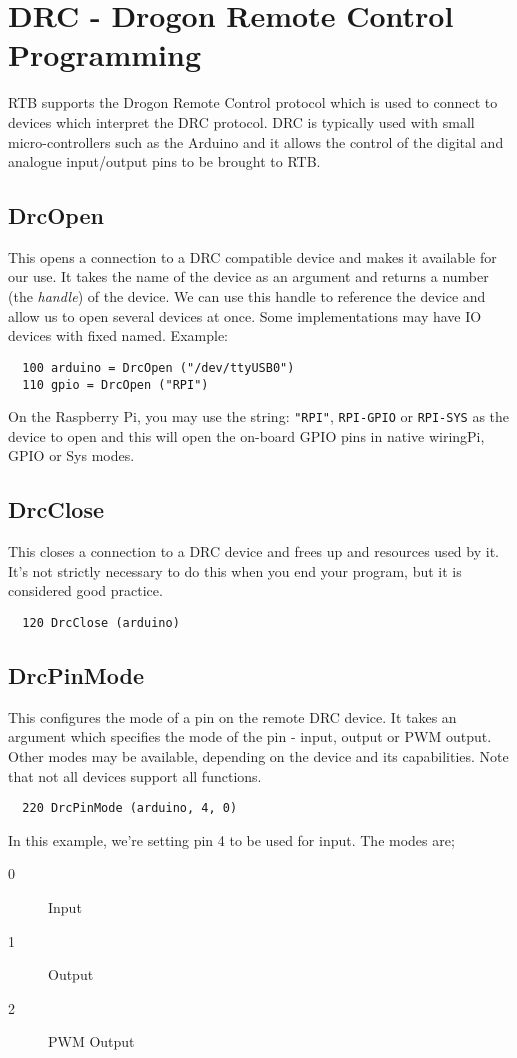 \chapter{DRC - Drogon Remote Control Programming}
RTB supports the Drogon Remote Control protocol which is used to connect
to devices which interpret the DRC protocol. DRC is typically used with
small micro-controllers such as the Arduino and it allows the control of
the digital and analogue input/output pins to be brought to RTB.

\section{DrcOpen}
This opens a connection to a DRC compatible device and makes it
available for our use. It takes the name of the device as an argument
and returns a number (the {\em handle}) of the device. We can use this
handle to reference the device and allow us to open several devices at
once. Some implementations may have IO devices with fixed named. Example:
\begin{verbatim}
  100 arduino = DrcOpen ("/dev/ttyUSB0")
  110 gpio = DrcOpen ("RPI")
\end{verbatim}
On the Raspberry Pi, you may use the string: {\tt "RPI"}, {\tt RPI-GPIO}
or {\tt RPI-SYS} as the device to open and this will open the on-board
GPIO pins in native wiringPi, GPIO or Sys modes.

\section{DrcClose}
This closes a connection to a DRC device and frees up and resources used
by it. It's not strictly necessary to do this when you end your program,
but it is considered good practice.
\begin{verbatim}
  120 DrcClose (arduino)
\end{verbatim}

\section{DrcPinMode}
This configures the mode of a pin on the remote DRC device. It takes
an argument which specifies the mode of the pin - input, output or PWM
output. Other modes may be available, depending on the device and its 
capabilities. Note that not all devices support all functions.
\begin{verbatim}
  220 DrcPinMode (arduino, 4, 0)
\end{verbatim}
In this example, we're setting pin 4 to be used for input. The modes are;
\begin{description}
\item[0] Input
\item[1] Output
\item[2] PWM Output
\end{description}

